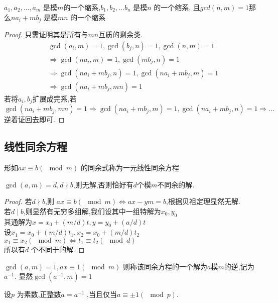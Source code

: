 \begin{proposition}
  $a_1,a_2,\dots,a_m$ 是模$m$的一个缩系,$b_1,b_2,\dots b_n$ 是模$n$ 的一个缩系, 且$gcd(n,m)=1$那么$na_i+mb_j$ 是模$mn$ 的一个缩系
\end{proposition}

\begin{proof}
  只需证明其是所有与$mn$互质的剩余类.
$$
\begin{aligned}
  &\gcd(a_i,m)=1,\gcd(b_j,n)=1,\gcd(n,m)=1 \\&\Rightarrow \gcd(na_i,m)=1,\gcd(mb_j,n)=1\\  &\Rightarrow \gcd(na_i+mb_j,n)=1,\gcd(na_i+mb_j,m)=1\\& \Rightarrow \gcd(na_i+mb_j,mn)=1
\end{aligned}
$$
若将$a_i,b_j$扩展成完系,若$\gcd(na_i+mb_j,mn)=1 \Rightarrow \gcd(na_i+mb_j,m)=1,\gcd(na_i+mb_j,n)=1\Rightarrow \dots$ 逆着证回去即可.
\end{proof}


\subsection{线性同余方程}
\begin{definition}
  形如$ax \equiv b (\mod m)$ 的同余式称为一元线性同余方程
\end{definition}

\begin{theorem}
  $\gcd(a,m)=d,d\nmid b$,则无解,否则恰好有$d$个模$m$不同余的解.
\end{theorem}


\begin{proof}
  若$d\nmid b$,则 $ax \equiv b (\mod m)\iff ax-ym=b$,根据贝祖定理显然无解.\\
若$d\mid b$,则显然有无穷多组解,我们设其中一组特解为$x_0,y_0$ \\
其通解为$x=x_0+(m/d)t,y=y_0+(a/d)t$\\
设$x_1=x_0+(m/d)t_1,x_2=x_0+(m/d)t_2$\\
$x_1 \equiv x_2 (\mod m) \iff t_1 \equiv t_2 (\mod d)$\\
所以有$d$ 个不同于的解.
\end{proof}


\begin{definition}
  $\gcd(a,m)=1,ax \equiv 1 (\mod m)$ 则称该同余方程的一个解为$a$模$m$的逆,记为$a^{-1}$.
显然$\gcd(a^{-1},m)=1$
\end{definition}

\begin{theorem}
  设$p$ 为素数,正整数$a=a^{-1}$ ,当且仅当$a \equiv \pm 1(\mod p)$.
\end{theorem}


